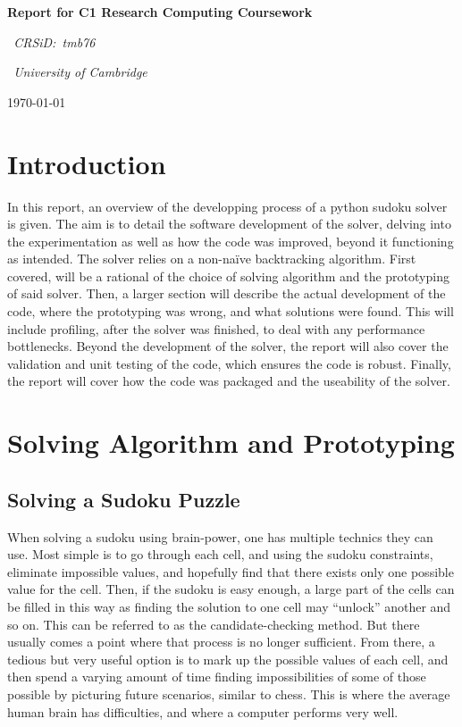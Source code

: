 \documentclass[12pt]{report} %
\begin{document}
\begin{titlepage}
  \centering
  \vspace*{2cm}
  {\LARGE\bfseries Report for C1 Research Computing Coursework\par}
  \vspace{1cm}
  {\Large\itshape\ CRSiD:\ tmb76\par}
  \vspace{1cm}
  {\Large\itshape\ University of Cambridge\par}
  \vfill
  {\large\today\par}
\end{titlepage}

\tableofcontents

\newpage

\chapter{Introduction}

In this report, an overview of the developping process of a python sudoku solver is given. The aim is to detail the software development of the solver, delving into the experimentation as well as how the code was improved, beyond it functioning as intended. The solver relies on a non-naïve backtracking algorithm. First covered, will be a rational of the choice of solving algorithm and the prototyping of said solver. Then, a larger section will describe the actual development of the code, where the prototyping was wrong, and what solutions were found. This will include profiling, after the solver was finished, to deal with any performance bottlenecks. Beyond the development of the solver, the report will also cover the validation and unit testing of the code, which ensures the code is robust. Finally, the report will cover how the code was packaged and the useability of the solver.


\chapter{Solving Algorithm and Prototyping}

\section{Solving a Sudoku Puzzle}

When solving a sudoku using brain-power, one has multiple technics they can use. Most simple is to go through each cell, and using the sudoku constraints, eliminate impossible values, and hopefully find that there exists only one possible value for the cell. Then, if the sudoku is easy enough, a large part of the cells can be filled in this way as finding the solution to one cell may ``unlock'' another and so on. This can be referred to as the candidate-checking method\cite{cornell_sudoku}.
But there usually comes a point where that process is no longer sufficient. From there, a tedious but very useful option is to mark up the possible values of each cell, and then spend a varying amount of time finding impossibilities of some of those possible by picturing future scenarios, similar to chess\cite{cornell_sudoku}. This is where the average human brain has difficulties, and where a computer performs very well.
\end{document}
